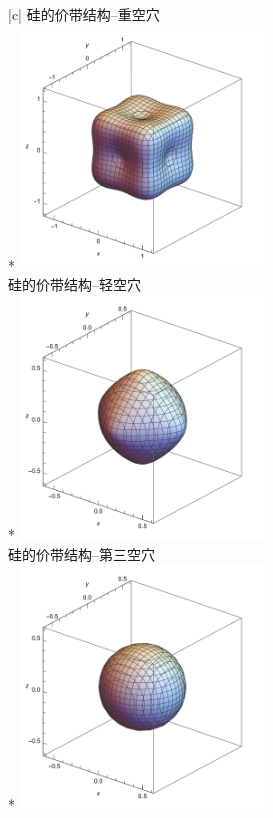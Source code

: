 \begin{TableLong}[硅的价带结构]{|c|}
    硅的价带结构--重空穴\\*
    \hlinelig 
    \includegraphics[width=6.5cm]{Mathematica/output/eqE_V1.pdf}\\
    \hlinemid
    硅的价带结构--轻空穴\\*
    \hlinelig
    \includegraphics[width=6.5cm]{Mathematica/output/eqE_V2.pdf}\\
    \hlinemid
    硅的价带结构--第三空穴\\*
    \hlinelig
    \includegraphics[width=6.5cm]{Mathematica/output/eqE_V3.pdf}\\
\end{TableLong}

